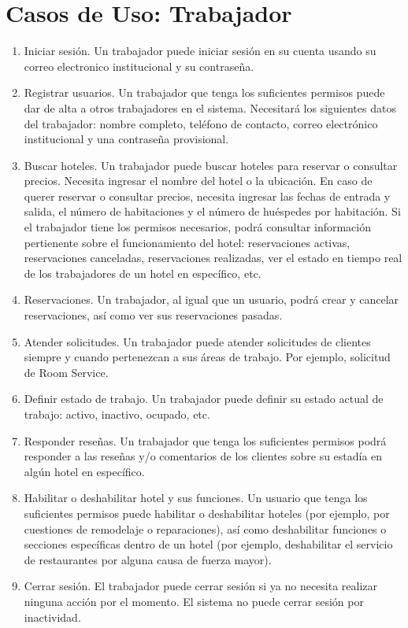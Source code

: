 \section{\bfseries\LARGE Casos de Uso: Trabajador}
\begin{enumerate}
    \item Iniciar sesión. Un trabajador puede iniciar sesión en su cuenta usando su correo electronico institucional y su contraseña.
    \item Registrar usuarios. Un trabajador que tenga los suficientes permisos puede dar de alta a otros trabajadores en el sistema. Necesitará los siguientes datos del trabajador: nombre completo, teléfono de contacto, correo electrónico institucional y una contraseña provisional.
    \item Buscar hoteles. Un trabajador puede buscar hoteles para reservar o consultar precios. Necesita ingresar el nombre del hotel o la ubicación. En caso de querer reservar o consultar precios, necesita ingresar las fechas de entrada y salida, el número de habitaciones y el número de huéspedes por habitación. Si el trabajador tiene los permisos necesarios, podrá consultar información pertienente sobre el funcionamiento del hotel: reservaciones activas, reservaciones canceladas, reservaciones realizadas, ver el estado en tiempo real de los trabajadores de un hotel en específico, etc.
    \item Reservaciones. Un trabajador, al igual que un usuario, podrá crear y cancelar reservaciones, así como ver sus reservaciones pasadas.
    \item Atender solicitudes. Un trabajador puede atender solicitudes de clientes siempre y cuando pertenezcan a sus áreas de trabajo. Por ejemplo, solicitud de Room Service.
    \item Definir estado de trabajo. Un trabajador puede definir su estado actual de trabajo: activo, inactivo, ocupado, etc.
    \item Responder reseñas. Un trabajador que tenga los suficientes permisos podrá responder a las reseñas y/o comentarios de los clientes sobre su estadía en algún hotel en específico.
    \item Habilitar o deshabilitar hotel y sus funciones. Un usuario que tenga los suficientes permisos puede habilitar o deshabilitar hoteles (por ejemplo, por cuestiones de remodelaje o reparaciones), así como deshabilitar funciones o secciones específicas dentro de un hotel (por ejemplo, deshabilitar el servicio de restaurantes por alguna causa de fuerza mayor).
    \item Cerrar sesión. El trabajador puede cerrar sesión si ya no necesita realizar ninguna acción por el momento. El sistema no puede cerrar sesión por inactividad.
\end{enumerate}